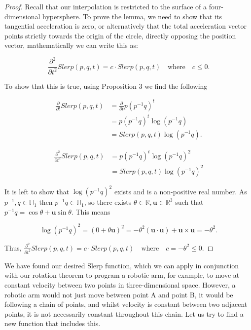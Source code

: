 \documentclass[a4paper, 11pt]{article}
\begin{document}
\begin{proof}

Recall that our interpolation is restricted to the surface of a four-dimensional hypersphere. To prove the lemma, we need to show that its tangential acceleration is zero, or alternatively that the total acceleration vector points strictly towards the origin of the circle, directly opposing the position vector, mathematically we can write this as:

\[\frac{\partial^2}{\partial t^2}Slerp(p,q,t)   =c\cdot Slerp(p, q, t) \quad \text{where} \quad c \le 0.\]

To show that this is true, using Proposition 3 we find the following 

\begin{align*}\frac{\partial}{\partial t}Slerp(p,q,t) &= \frac{\partial}{\partial t} p(p^{-1}q)^t\\ &= p(p^{-1}q)^t\log (p^{-1}q) \\  &= Slerp(p,q,t)\log(p^{-1}q).\end{align*} 

\begin{align*}\frac{\partial^2}{\partial t^2}Slerp(p,q,t) &=  p(p^{-1}q)^t\log (p^{-1}q)^2 \\  &= Slerp(p,q,t)\log(p^{-1}q)^2\end{align*}

It is left to show that $\log(p^{-1}q)^2$ exists and is a non-positive real number. As $p^{-1},q \in \mathbb{H}_1$ then $p^{-1}q \in \mathbb{H}_1$, so there exists $\theta \in \mathbb{R}, \boldsymbol{u} \in \mathbb{R}^3$ such that $p^{-1}q = \cos\theta + \boldsymbol{u}\sin\theta$. This means

\[\log(p^{-1}q)^2 = (0 +\theta\boldsymbol{u})^2 = -\theta^2 (\boldsymbol{u}\cdot \boldsymbol{u}) + \boldsymbol{u} \times \boldsymbol{u} = -\theta^2.\]

Thus, $\frac{\partial^2}{\partial t^2}Slerp(p,q,t)   =c\cdot Slerp(p, q, t) \quad \text{where} \quad c = -\theta^2 \le 0$.
\end{proof}

We have found our desired Slerp function, which we can apply in conjunction with our rotation theorem to program a robotic arm, for example, to move at constant velocity between two points in three-dimensional space. However, a robotic arm would not just move between point A and point B, it would be following a chain of points, and whilst velocity is constant between two adjacent points, it is not necessarily constant throughout this chain. Let us try to find a new function that includes this.
\end{document}
